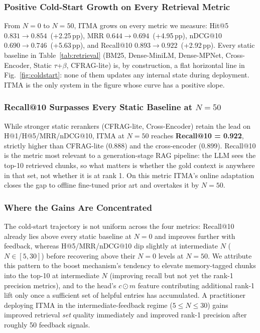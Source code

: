 \documentclass[journal]{IEEEtran}
\begin{document}
\subsubsection{Positive Cold-Start Growth on Every Retrieval Metric}
From $N{=}0$ to $N{=}50$, ITMA grows on every metric we measure:
Hit@5 $0.831\rightarrow 0.854$~(+2.25\,pp), MRR
$0.644\rightarrow 0.694$~(+4.95\,pp), nDCG@10
$0.690\rightarrow 0.746$~(+5.63\,pp), and Recall@10
$0.893\rightarrow 0.922$~(+2.92\,pp).  Every static baseline in
Table~\ref{tab:retrieval} (BM25, Dense-MiniLM, Dense-MPNet,
Cross-Encoder, Static $\tau$+$\beta$, CFRAG-lite) is, by construction,
a flat horizontal line in Fig.~\ref{fig:coldstart}: none of them updates
any internal state during deployment.  ITMA is the only system in the
figure whose curve has a positive slope.

\subsubsection{Recall@10 Surpasses Every Static Baseline at $N{=}50$}
While stronger static rerankers (CFRAG-lite, Cross-Encoder) retain the
lead on H@1/H@5/MRR/nDCG@10, ITMA at $N{=}50$ reaches
\textbf{Recall@10 = 0.922}, strictly higher than CFRAG-lite (0.888) and
the cross-encoder (0.899).  Recall@10 is the metric most relevant to a
generation-stage RAG pipeline: the LLM sees the top-10 retrieved chunks,
so what matters is whether the gold context is anywhere in that set,
not whether it is at rank 1.  On this metric ITMA's online adaptation
closes the gap to offline fine-tuned prior art and overtakes it by
$N{=}50$.

\subsubsection{Where the Gains Are Concentrated}
The cold-start trajectory is not uniform across the four metrics:
Recall@10 already lies above every static baseline at $N{=}0$ and
improves further with feedback, whereas H@5/MRR/nDCG@10 dip slightly
at intermediate $N$ ($N{\in}[5,30]$) before recovering above their
$N{=}0$ levels at $N{=}50$.  We attribute this pattern to the boost
mechanism's tendency to elevate memory-tagged chunks into the top-10 at
intermediate $N$ (improving recall but not yet the rank-1 precision
metrics), and to the head's $c{\odot}m$ feature contributing additional
rank-1 lift only once a sufficient set of helpful entries has
accumulated.  A practitioner deploying ITMA in the intermediate-feedback
regime ($5\!\le\!N\!\le\!30$) gains improved retrieval \emph{set}
quality immediately and improved rank-1 precision after roughly 50
feedback signals.
\end{document}
